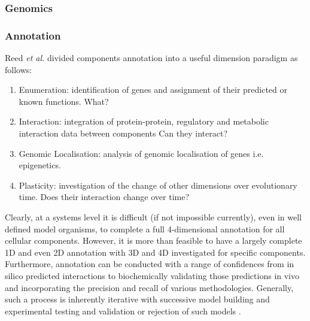 \subsubsection{Genomics}




\subsubsection{Annotation}

Reed \textit{et al.} \citep{Reed2006} divided components annotation into a useful dimension paradigm as follows:
\begin{enumerate}
    \item Enumeration: identification of genes and assignment of their predicted or known functions. What?
    \item Interaction: integration of protein-protein, regulatory and metabolic interaction data between components Can they interact?
    \item Genomic Localisation: analysis of genomic localisation of genes i.e. epigenetics.
    \item Plasticity: investigation of the change of other dimensions over evolutionary time. Does their interaction change over time? \citep{Reed2006} 
\end{enumerate}

Clearly, at a systems level it is difficult (if not impossible currently), 
even in well defined model organisms, to complete a full 4-dimensional annotation 
for all cellular components. However, it is more than feasible to have a largely
complete 1D and even 2D annotation with 3D and 4D investigated for specific 
components.  Furthermore, annotation can be conducted with a range of confidences
from in silico predicted interactions to biochemically validating those predictions in vivo
and incorporating the precision and recall of various methodologies. Generally, such a process
is inherently iterative with successive model building and experimental testing and validation 
or rejection of such models \citep{Reed2006}.

